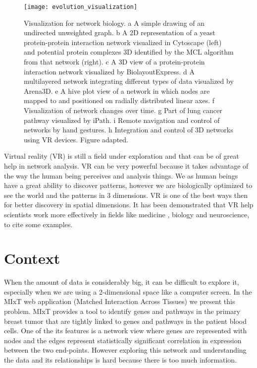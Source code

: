 \begin{figure}[h!]
    \newlength{\tempheight}
    \setlength{\tempheight}{15ex}
    \centering%
    \texttt{[image: evolution\_visualization]}
    \caption{Visualization for network biology. a A simple drawing of an undirected unweighted graph. b A 2D representation of a yeast protein-protein interaction network visualized in Cytoscape (left) and potential protein complexes 3D identified by the MCL algorithm from that network (right). c A 3D view of a protein-protein interaction network visualized by BiolayoutExpress. d A multilayered network integrating different types of data visualized by Arena3D. e A hive plot view of a network in which nodes are mapped to and positioned on radially distributed linear axes. f Visualization of network changes over time. g Part of lung cancer pathway visualized by iPath. i Remote navigation and control of networks by hand gestures. h Integration and control of 3D networks using VR devices. Figure adapted\cite{pavlopoulos_malliarakis_papanikolaou_theodosiou_enright_iliopoulos_2015}.}
    \label{fig:network_biology_evolution}
\end{figure}%

Virtual reality (VR) is still a field under exploration and that can be of great help in network analysis. VR can be very powerful because it takes advantage of the way the human being perceives and analysis things. We as human beings have a great ability to discover patterns, however we are biologically optimized to see the world and the patterns in 3 dimensions. VR is one of the best ways then for better discovery in spatial dimensions. It has been demonstrated that VR help scientists work more effectively in fields like medicine \cite{Laver11}\cite{xia_ip_samman_wong_gateno_wang_yeung_kot_tideman_2001}\cite{brain_damage_rehab}, biology\cite{10.1093/bioinformatics/bti581}\cite{thorley_lawson_duca_shapiro_2008} and neuroscience\cite{bohil_alicea_biocca_2011}\cite{minderer_harvey_donato_moser_2016}, to cite some examples.

\section{Context}

When the amount of data is considerably big, it can be difficult to explore it, especially when we are using a 2-dimensional space like a computer screen. In the MIxT web application (Matched Interaction Across Tissues)\cite{fjukstad_dumeaux_olsen_lund_hallett_bongo_2017}\cite{dumeaux_fjukstad_interactions_tumor_blood} we present this problem. MIxT provides a tool to identify genes and pathways in the primary breast tumor that are tightly linked to genes and pathways in the patient blood cells\cite{dumeaux_fjukstad_interactions_tumor_blood}. One of the its features is a network view where genes are represented with nodes and the edges represent statistically significant correlation in expression between the two end-points. However exploring this network and understanding the data and its relationships is hard because there is too much information.

